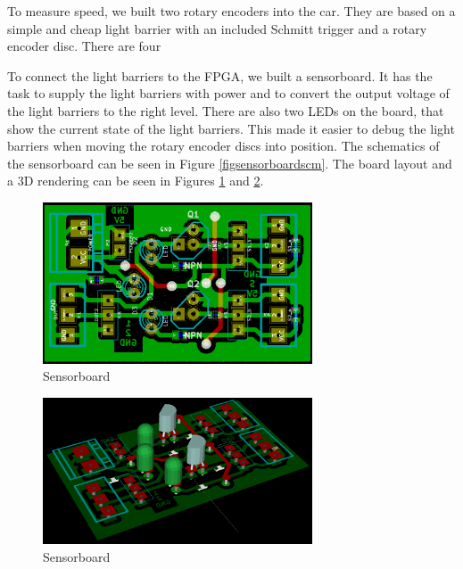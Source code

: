 \documentclass[12pt]{article}
\begin{document}
To measure speed, we built two rotary encoders into the car.
They are based on a simple and cheap light barrier with an included Schmitt trigger and a rotary encoder disc.
There are four 



To connect the light barriers to the FPGA, we built a sensorboard. It has the task to supply the light barriers with power and to convert the output voltage of the light barriers to the right level.
There are also two LEDs on the board, that show the current state of the light barriers.
This made it easier to debug the light barriers when moving the rotary encoder discs into position.
The schematics of the sensorboard can be seen in Figure \ref{figsensorboardscm}. The board layout and a 3D rendering can be seen in Figures \ref{figsensorboardbrd} and \ref{figsensorboard3d}.

\begin{figure}[htb]
\begin{center}
\includegraphics[width=8cm]{pic/sensorboardbrd.png}
\caption{Sensorboard}
\end{center}
\label{figsensorboardbrd}
\end{figure}

\begin{figure}[htb]
\begin{center}
\includegraphics[width=8cm]{pic/sensorboard3d.png}
\caption{Sensorboard}
\end{center}
\label{figsensorboard3d}
\end{figure}
\end{document}
